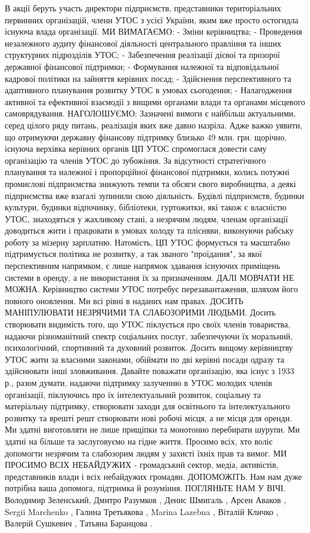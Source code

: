        В акції беруть участь директори підприємств, представники територіальних первинних організацій, члени УТОС з усієї України, яким вже просто остогидла існуюча влада організації.
       МИ ВИМАГАЄМО:
- Зміни керівництва;
- Проведення незалежного аудиту фінансової діяльності центрального правління та інших структурних підрозділів УТОС;
- Забезпечення реалізації дієвої та прозорої державної фінансової підтримки;
- Формування належної та відповідальної кадрової політики на зайняття керівних посад;
- Здійснення перспективного та адаптивного планування розвитку УТОС в умовах сьогодення;
- Налагодження активної та ефективної взаємодії з вищими органами влади та органами місцевого самоврядування.
      НАГОЛОШУЄМО: Зазначені вимоги є найбільш актуальними, серед цілого ряду питань, реалізація яких вже давно назріла.  Адже важко уявити, що отримуючи державну фінансову підтримку близько 49 млн. грн. щорічно, існуюча верхівка керівних органів ЦП УТОС спромоглася довести саму організацію та членів УТОС до зубожіння. 
За відсутності стратегічного планування та належної і пропорційної фінансової підтримки, колись потужні промислові підприємства знижують темпи та обсяги свого виробництва, а деякі підприємства вже взагалі зупинили свою діяльність. Будівлі підприємств, будинки культури, будинки відпочинку, бібліотеки, гуртожитки, які також є власністю  УТОС, знаходяться у жахливому стані, а незрячим людям, членам організації доводиться жити і працювати в умовах холоду та плісняви, виконуючи рабську роботу за мізерну зарплатню. Натомість, ЦП УТОС формується та масштабно підтримується політика не розвитку, а так званого "проїдання", за якої перспективним напрямком, є лише напрямок здавання існуючих приміщень системи в оренду, а не використання їх за призначенням.          ДАЛІ МОВЧАТИ НЕ МОЖНА. Керівництво системи УТОС потребує перезавантаження, шляхом його повного оновлення. Ми всі рівні в наданих нам правах.
ДОСИТЬ МАНІПУЛЮВАТИ НЕЗРЯЧИМИ ТА СЛАБОЗОРИМИ ЛЮДЬМИ. Досить створювати видимість того, що УТОС піклується про своїх членів товариства, надаючи різноманітний спектр соціальних послуг, забезпечуючи їх моральний, психологічний, спортивний та духовний розвиток. Досить вищому керівництву УТОС жити за власними
законами, обіймати по дві керівні посади одразу та здійснювати інші зловживання. Давайте поважати організацію, яка існує з 1933 р., разом думати, надаючи підтримку залученню в УТОС молодих членів організації, піклуючись про їх інтелектуальний розвиток, соціальну та матеріальну
підтримку, створювати заходи для освітнього та інтелектуального розвитку та врешті решт створювати нові робочі місця, а не місця для оренди. Ми здатні виготовляти не лише прищіпки та монотонно перебирати шурупи. Ми здатні на більше та заслуговуємо на гідне життя.
      Просимо всіх, хто воліє допомогти незрячим та слабозорим людям у захисті їхніх прав та вимог.
МИ ПРОСИМО ВСІХ НЕБАЙДУЖИХ - громадський сектор, медіа, активістів, представників влади і всіх небайдужих громадян. ДОПОМОЖІТЬ. Нам нам дуже потрібна ваша допомога, підтримка й розуміння. ПОГЛЯНЬТЕ НАМ У ВІЧІ.
Володимир Зеленський, Дмитро Разумков
, Денис Шмигаль
, Арсен Аваков
, Sergii Marchenko
, Галина Третьякова
,
Marina Lazebna
, Віталій Кличко
, Валерій Сушкевич
, Татьяна Баранцова
.

